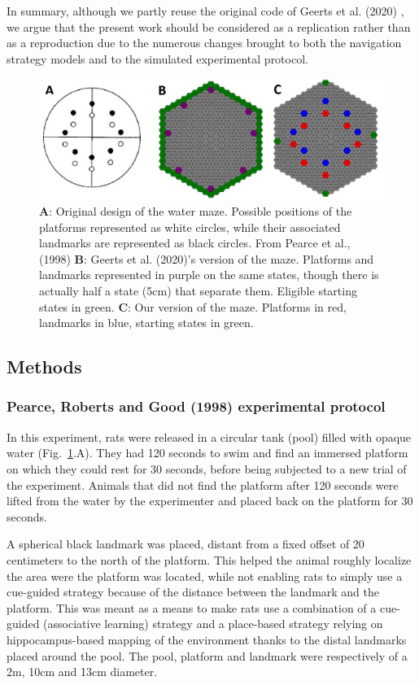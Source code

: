 In summary, although we partly reuse the original code of Geerts et al. (2020) \cite{Geerts:2020}, we argue that the present work should be considered as a replication rather than as a reproduction due to the numerous changes brought to both the navigation strategy models and to the simulated experimental protocol.

\begin{figure}[htp]
    \centering
    \includegraphics[width=12cm]{Geerts_Original_Maze2.JPG}
    \caption{{\bf A}: Original design of the water maze. Possible positions of the platforms represented as white circles, while their associated landmarks are represented as black circles. From Pearce et al., (1998) {\bf B}: Geerts et al. (2020)'s version of the maze. Platforms and landmarks represented in purple on the same states, though there is actually half a state (5cm) that separate them. Eligible starting states in green. {\bf C}: Our version of the maze. Platforms in red, landmarks in blue, starting states in green.}
    \label{fig:maze}
\end{figure} 

\subsection{Methods}

\subsubsection{Pearce, Roberts and Good (1998) experimental protocol}
In this experiment, rats were released in a circular tank (pool) filled with opaque water (Fig.~\ref{fig:maze}.A). They had 120 seconds to swim and find an immersed platform on which they could rest for 30 seconds, before being subjected to a new trial of the experiment. Animals that did not find the platform after 120 seconds were lifted from the water by the experimenter and placed back on the platform for 30 seconds.

A spherical black landmark was placed, distant from a fixed offset of 20 centimeters to the north of the platform. This helped the animal roughly localize the area were the platform was located, while not enabling rats to simply use a cue-guided strategy because of the distance between the landmark and the platform. This was meant as a means to make rats use a combination of a cue-guided (associative learning) strategy and a place-based strategy relying on hippocampus-based mapping of the environment thanks to the distal landmarks placed around the pool. The pool, platform and landmark were respectively of a 2m, 10cm and 13cm diameter.

